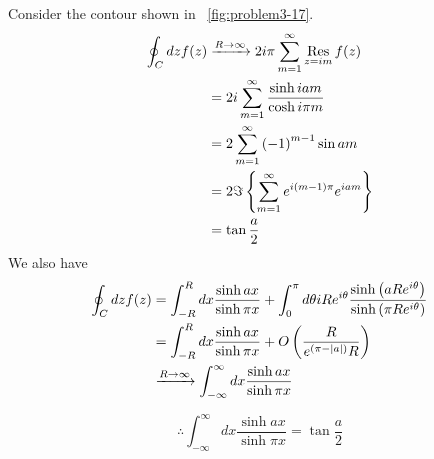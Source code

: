 Consider the contour shown in ~\ref{fig:problem3-17}.
\begin{align*}
    \oint_C dz f(z)
    &\xrightarrow{R \rightarrow \infty} 2i\pi \sum_{m=1}^\infty \mathop{\mathrm{Res}}_{z = im} f(z) \\
    &= 2i \sum_{m=1}^\infty \frac{\sinh iam}{\cosh i\pi m} \\
    &= 2\sum_{m=1}^\infty {(-1)}^{m-1} \sin am \\
    &= 2 \Im\left\{ \sum_{m=1}^\infty e^{i(m-1)\pi} e^{iam} \right\} \\
    &= \tan \frac{a}{2}
\end{align*}
We also have
\begin{align*}
    \oint_C dz f(z)
    &= \int_{-R}^R dx \frac{\sinh ax}{\sinh \pi x}
     + \int_0^\pi d\theta iRe^{i\theta} \frac{\sinh\left( aRe^{i\theta} \right)}{\sinh\left( \pi Re^{i\theta} \right)} \\ 
    &= \int_{-R}^R dx \frac{\sinh ax}{\sinh \pi x}
     + O\left( \frac{R}{e^{\left( \pi - \left| a \right| \right)}R} \right) \\
    &\xrightarrow{R \rightarrow \infty} \int_{-\infty}^\infty dx \frac{\sinh ax}{\sinh \pi x}
\end{align*}

\[
    \therefore \int_{-\infty}^\infty dx \frac{\sinh ax}{\sinh \pi x} = \tan \frac{a}{2}
\]

